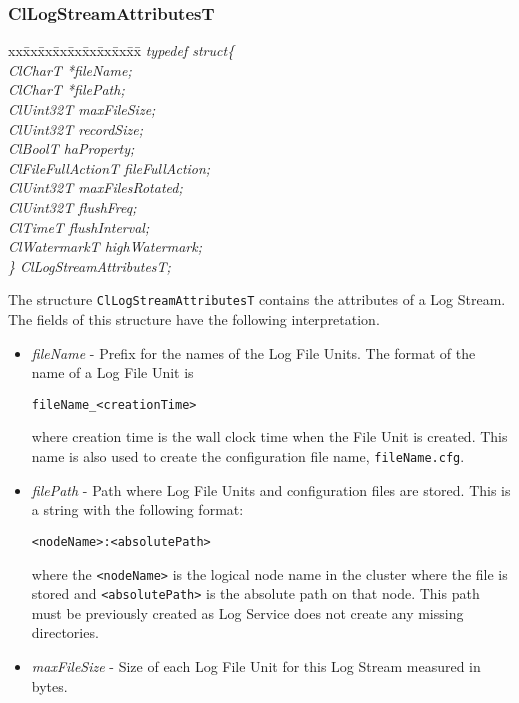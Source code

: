 \begin{flushleft}
\subsubsection{ClLogStreamAttributesT}
\begin{tabbing}
xx\=xx\=xx\=xx\=xx\=xx\=xx\=xx\=xx\=\kill
\textit{typedef struct\{}\\
\>\>\>\>\textit{ClCharT		*fileName;}\\
\>\>\>\>\textit{ClCharT		*filePath;}\\
\>\>\>\>\textit{ClUint32T		maxFileSize;}\\
\>\>\>\>\textit{ClUint32T		recordSize;}\\
\>\>\>\>\textit{ClBoolT		haProperty;}\\
\>\>\>\>\textit{ClFileFullActionT	fileFullAction;}\\
\>\>\>\>\textit{ClUint32T		maxFilesRotated;}\\
\>\>\>\>\textit{ClUint32T		flushFreq;}\\
\>\>\>\>\textit{ClTimeT		flushInterval;}\\
\>\>\>\>\textit{ClWatermarkT	highWatermark;}\\
\textit{\} ClLogStreamAttributesT;}\end{tabbing}
The structure {\tt{ClLogStreamAttributesT}} contains the attributes of a Log Stream. The fields of this structure have the following interpretation.
	\begin{itemize}
	\item
	\textit{fileName} - Prefix for the names of the Log File Units. The format of the name of a Log File Unit is 
	\par
	{\tt{fileName\_\-<creationTime>}} 
	\par
	where creation time is the wall clock time when the File Unit is created. This name is also used to create the configuration file name, 
	{\tt{fileName.cfg}}.
	\item
	\textit{filePath} - Path where Log File Units and configuration files are stored. This is a string with the following format:
	\par
	{\tt{<nodeName>:<absolutePath>}}
	\par
	where the {\tt{<nodeName>}} is the logical node name in the cluster where the file is stored and 
	{\tt{<absolutePath>}} is the absolute path on that node. This path must be previously created as Log Service does not create any missing directories.
	\item
	\textit{maxFileSize} - Size of each Log File Unit for this Log Stream measured in bytes. 

\end{itemize}
\end{flushleft}
